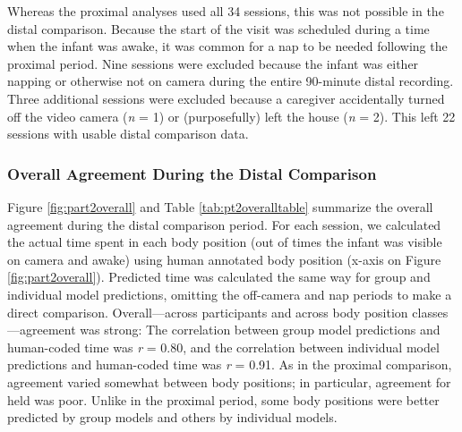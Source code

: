 \documentclass[
  man]{apa6}
\begin{document}
Whereas the proximal analyses used all 34 sessions, this was not possible in the distal comparison. Because the start of the visit was scheduled during a time when the infant was awake, it was common for a nap to be needed following the proximal period. Nine sessions were excluded because the infant was either napping or otherwise not on camera during the entire 90-minute distal recording. Three additional sessions were excluded because a caregiver accidentally turned off the video camera (\emph{n} = 1) or (purposefully) left the house (\emph{n} = 2). This left 22 sessions with usable distal comparison data.

\hypertarget{overall-agreement-during-the-distal-comparison}{%
\subsubsection{Overall Agreement During the Distal Comparison}\label{overall-agreement-during-the-distal-comparison}}

Figure \ref{fig:part2overall} and Table \ref{tab:pt2overalltable} summarize the overall agreement during the distal comparison period. For each session, we calculated the actual time spent in each body position (out of times the infant was visible on camera and awake) using human annotated body position (x-axis on Figure \ref{fig:part2overall}). Predicted time was calculated the same way for group and individual model predictions, omitting the off-camera and nap periods to make a direct comparison. Overall---across participants and across body position classes---agreement was strong: The correlation between group model predictions and human-coded time was \emph{r} = 0.80, and the correlation between individual model predictions and human-coded time was \emph{r} = 0.91. As in the proximal comparison, agreement varied somewhat between body positions; in particular, agreement for held was poor. Unlike in the proximal period, some body positions were better predicted by group models and others by individual models.
\end{document}
